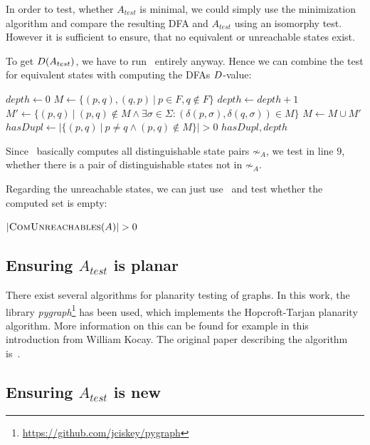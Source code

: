 In order to test, whether $A_{test}$ is minimal, we could simply use the minimization algorithm and compare the resulting DFA and $A_{test}$ using an isomorphy test. However it is sufficient to ensure, that no equivalent or unreachable states exist.

To get $D(A_{test})$, we have to run \CompDist\ entirely anyway. Hence we can combine the test for equivalent states with computing the DFAs $D$-value:
\vspace{0.2cm}
\begin{algorithmic}[1]
		\State $depth \gets 0$
		\State $M \gets \{ (p,q), (q,p)\ |\ p \in F, q \notin F \}$
		\Do
			\State $depth \gets depth + 1$
			\State $M' \gets \{ (p,q)\ |\ (p,q) \notin M \land \exists \sigma \in \Sigma \colon (\delta(p,\sigma), \delta(q,\sigma)) \in M \}$
			\State $M \gets M \cup M'$
		\State $hasDupl \gets | \{ (p,q)\ |\ p \neq q \land (p,q) \notin M \} | > 0$
		\State \Return $hasDupl, depth$
	\EndFunction
\end{algorithmic}
\vspace{0.2cm}
Since \CompDist\ basically computes all distinguishable state pairs $\not\sim_A$, we test in line $9$, whether there is a pair of distinguishable states not in $\not\sim_A$.

Regarding the unreachable states, we can just use \CompUnr\ and test whether the computed set is empty:
\vspace{0.2cm}
\begin{algorithmic}[1]
	\State \Return $|\textsc{ComUnreachables}(A)| > 0$
	\EndFunction
\end{algorithmic}

\subsection{Ensuring $A_{test}$ is planar}

There exist several algorithms for planarity testing of graphs. In this work, the library \emph{pygraph}\footnote{\url{https://github.com/jciskey/pygraph}} has been used, which implements the Hopcroft-Tarjan planarity algorithm. More information on this can be found for example in this~\cite{Koc93} introduction from William Kocay. The original paper describing the algorithm is~\cite{HT74}.

\subsection{Ensuring $A_{test}$ is new}

